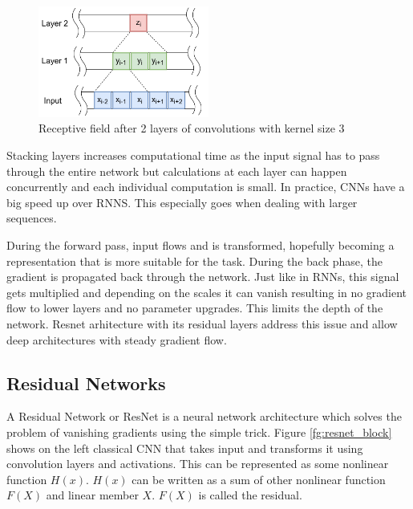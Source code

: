 \documentclass[times, utf8, diplomski, numeric, english]{fer}
\begin{document}
\begin{figure}[!ht]
	\begin{center}
		\includegraphics[width=0.5\textwidth]{./imgs/receptive_field.png}
		\caption{Receptive field after 2 layers of convolutions with kernel size 3}
		\label{fg:receptive field}
	\end{center}
\end{figure}
Stacking layers increases computational time as the input signal has to pass through the entire network but calculations at each layer can happen concurrently and each individual computation is small.
In practice, CNNs have a big speed up over RNNS. This especially goes when dealing with larger sequences\cite{facebook}.

During the forward pass, input flows and is transformed, hopefully becoming a representation that is more suitable for the task. During the back phase, the gradient is propagated back through the network. Just like in RNNs, this signal gets multiplied and depending on the scales it can vanish resulting in no gradient flow to lower layers and no parameter upgrades. This limits the depth of the network. Resnet arhitecture\cite{resnet} with its residual layers address this issue and allow deep architectures with steady gradient flow.




\subsection{Residual Networks}
A Residual Network or ResNet is a neural network architecture which solves the problem of vanishing gradients using the simple trick.  
Figure \ref{fg:resnet_block}  shows on the left classical CNN that takes input and transforms it using convolution layers and activations.  This can be represented as some nonlinear function $ H(x) $. $ H(x) $ can be written as a sum of other nonlinear function $F(X)$ and linear member $X$. $  F(X) $ is called the residual.
\end{document}
